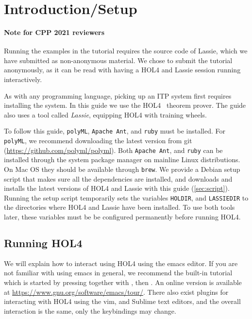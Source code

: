 \section{Introduction/Setup}
%
\paragraph{Note for CPP 2021 reviewers}
Running the examples in the tutorial requires the source code of Lassie, which
we have submitted as non-anonymous material. We chose to submit the tutorial
anonymously, as it can be read with having a HOL4 and Lassie session running
interactively.

As with any programming language, picking up an ITP system first requires
installing the system.
In this guide we use the HOL4~\cite{HOL4web} theorem prover.
The guide also uses a tool called \emph{Lassie}, equipping HOL4 with training
wheels.

To follow this guide, \texttt{polyML}, \texttt{Apache Ant}, and \texttt{ruby}
must be installed.
For \texttt{polyML}, we recommend downloading the latest version from git
(\url{https://github.com/polyml/polyml}).
Both \texttt{Apache Ant}, and \texttt{ruby} can be installed through the system
package manager on mainline Linux distributions.
On Mac OS they should be available through \texttt{brew}.
We provide a Debian setup script that makes sure all the dependencies are
installed,
and downloads and installs the latest versions of HOL4 and Lassie with this
guide (\autoref{sec:script}).
Running the setup script temporarily sets the variables \texttt{HOLDIR}, and
\texttt{LASSIEDIR} to the directories where HOL4 and Lassie have been installed.
To use both tools later, these variables must be be configured permanently
before running HOL4.

\subsection{Running HOL4}

We will explain how to interact using HOL4 using the emacs editor.
If you are not familiar with using emacs in general, we recommend the
built-in tutorial which is started by pressing  together with
, then . An online version is available at
\url{https://www.gnu.org/software/emacs/tour/}.
There also exist plugins for interacting with HOL4 using the vim, and Sublime
text editors, and the overall interaction is the same, only the keybindings may
change.

